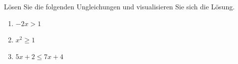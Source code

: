 \begin{ExerciseBlock}
Lösen Sie die folgenden Ungleichungen und visualisieren Sie sich die Lösung.
\begin{enumerate}[label=\alph*)]
	\item $\displaystyle -2x > 1$
	\item $\displaystyle x^2 \ge 1$
	\item $\displaystyle 5x+2 \le 7x+4$
\end{enumerate}

\end{ExerciseBlock}
